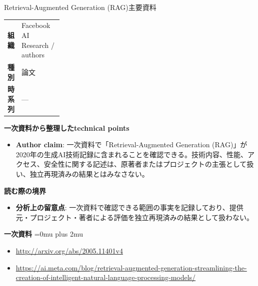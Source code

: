 \begin{technicalnote}{Retrieval-Augmented Generation (RAG)}{主要資料}
\begingroup
\begin{tabularx}{\linewidth}{@{}>{\bfseries}p{0.22\linewidth}X@{}}
組織 & Facebook AI Research / authors \\
種別 & 論文 \\
時系列 & — \\
\end{tabularx}
\smallskip
{\bfseries 一次資料から整理したtechnical points}
\begin{itemize}[leftmargin=1.5em,itemsep=0.35em]
\item \textbf{Author claim}: 一次資料で「Retrieval-Augmented Generation (RAG)」が2020年の生成AI技術記録に含まれることを確認できる。技術内容、性能、アクセス、安全性に関する記述は、原著者またはプロジェクトの主張として扱い、独立再現済みの結果とはみなさない。
\end{itemize}
\begin{minipage}{\linewidth}
{\bfseries 読む際の境界}
\begin{itemize}[leftmargin=1.5em,itemsep=0.35em]
\item \textbf{分析上の留意点}: 一次資料で確認できる範囲の事実を記録しており、提供元・プロジェクト・著者による評価を独立再現済みの結果として扱わない。
\end{itemize}
\begin{samepage}
{\bfseries 一次資料}
\begingroup\sloppy
\Urlmuskip=0mu plus 2mu\relax
\begin{itemize}[leftmargin=1.5em,itemsep=0.25em]
\item {\scriptsize\url{http://arxiv.org/abs/2005.11401v4}}
\item {\scriptsize\url{https://ai.meta.com/blog/retrieval-augmented-generation-streamlining-the-creation-of-intelligent-natural-language-processing-models/}}
\end{itemize}
\endgroup
\end{samepage}
\end{minipage}
\endgroup
\end{technicalnote}
\medskip

